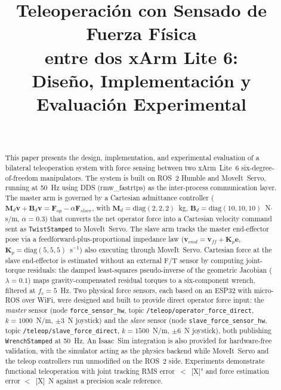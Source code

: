 \documentclass[journal,10pt,twoside]{IEEEtran}
\begin{document}
\title{Teleoperación con Sensado de Fuerza Física\\
  entre dos xArm Lite 6:\\
  Diseño, Implementación y Evaluación Experimental}

\author{%
  \\
}

\maketitle

\begin{abstract}
This paper presents the design, implementation, and experimental
evaluation of a bilateral teleoperation system with force sensing
between two xArm~Lite~6 six-degree-of-freedom manipulators. The
system is built on ROS~2 Humble and MoveIt~Servo, running at
50~Hz using DDS (rmw\_fastrtps) as the inter-process communication
layer. The master arm is governed by a Cartesian admittance controller
($\bm{M}_d\dot{\bm{v}} + \bm{B}_d\bm{v} = \bm{F}_{op}
- \alpha\bm{F}_{slave}$, with $\bm{M}_d=\text{diag}(2,2,2)$~kg,
$\bm{B}_d=\text{diag}(10,10,10)$~N$\cdot$s/m, $\alpha=0.3$) that
converts the net operator force into a Cartesian velocity command
sent as \texttt{TwistStamped} to MoveIt~Servo. The slave arm tracks
the master end-effector pose via a feedforward-plus-proportional
impedance law ($\bm{v}_{cmd}=\bm{v}_{ff}+\bm{K}_p\bm{e}$,
$\bm{K}_p=\text{diag}(5,5,5)$~s$^{-1}$) also executing through
MoveIt~Servo. Cartesian force at the slave end-effector is estimated
without an external F/T sensor by computing joint-torque residuals:
the damped least-squares pseudo-inverse of the geometric Jacobian
($\lambda=0.1$) maps gravity-compensated residual torques to a
six-component wrench, filtered at $f_c=5$~Hz. Two physical force
sensors, each based on an ESP32 with micro-ROS over WiFi, were
designed and built to provide direct operator force input: the
\emph{master} sensor (node \texttt{force\_sensor\_hw},
topic \texttt{/teleop/operator\_force\_direct}, $k=1000$~N/m,
$\pm3$~N joystick) and the \emph{slave} sensor
(node \texttt{slave\_force\_sensor\_hw},
topic \texttt{/teleop/slave\_force\_direct}, $k=1500$~N/m,
$\pm6$~N joystick), both publishing \texttt{WrenchStamped} at
50~Hz. An Isaac~Sim integration is also provided for hardware-free
validation, with the simulator acting as the physics backend while
MoveIt~Servo and the teleop controllers run unmodified on the
ROS~2 side. Experiments demonstrate functional teleoperation with
joint tracking RMS error~$<$~[X]° and force estimation error
$<$~[X]~N against a precision scale reference.
\end{abstract}
\end{document}
